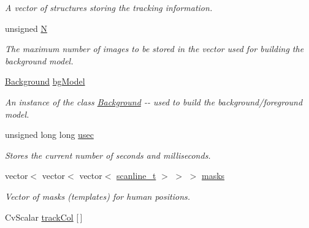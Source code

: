 \begin{DoxyCompactItemize}
\begin{DoxyCompactList}\small\item\em A vector of structures storing the tracking information. \item\end{DoxyCompactList}\item 
\hypertarget{classfindPersonStream_a8cc2e7240164328fdc3f0e5e21032c56}{
unsigned \hyperlink{classfindPersonStream_a8cc2e7240164328fdc3f0e5e21032c56}{N}}
\label{classfindPersonStream_a8cc2e7240164328fdc3f0e5e21032c56}

\begin{DoxyCompactList}\small\item\em The maximum number of images to be stored in the vector used for building the background model. \item\end{DoxyCompactList}\item 
\hypertarget{classfindPersonStream_a5d2a001b4866dcbf48866109c6541707}{
\hyperlink{classBackground}{Background} \hyperlink{classfindPersonStream_a5d2a001b4866dcbf48866109c6541707}{bgModel}}
\label{classfindPersonStream_a5d2a001b4866dcbf48866109c6541707}

\begin{DoxyCompactList}\small\item\em An instance of the class {\ttfamily \hyperlink{classBackground}{Background}} -\/-\/ used to build the background/foreground model. \item\end{DoxyCompactList}\item 
\hypertarget{classfindPersonStream_ab8a3060a5d457e6907f73cbbc25ccae0}{
unsigned long long \hyperlink{classfindPersonStream_ab8a3060a5d457e6907f73cbbc25ccae0}{usec}}
\label{classfindPersonStream_ab8a3060a5d457e6907f73cbbc25ccae0}

\begin{DoxyCompactList}\small\item\em Stores the current number of seconds and milliseconds. \item\end{DoxyCompactList}\item 
\hypertarget{classfindPersonStream_adad90fa030af56592ad194a41341ffcd}{
vector$<$ vector$<$ vector$<$ \hyperlink{structscanline__t}{scanline\_\-t} $>$ $>$ $>$ \hyperlink{classfindPersonStream_adad90fa030af56592ad194a41341ffcd}{masks}}
\label{classfindPersonStream_adad90fa030af56592ad194a41341ffcd}

\begin{DoxyCompactList}\small\item\em Vector of masks (templates) for human positions. \item\end{DoxyCompactList}\item 
\hypertarget{classfindPersonStream_ac1b0baa7d4a9b358f4ea4f2b643f174b}{
CvScalar \hyperlink{classfindPersonStream_ac1b0baa7d4a9b358f4ea4f2b643f174b}{trackCol} \mbox{[}$\,$\mbox{]}}
\label{classfindPersonStream_ac1b0baa7d4a9b358f4ea4f2b643f174b}


\end{DoxyCompactItemize}
